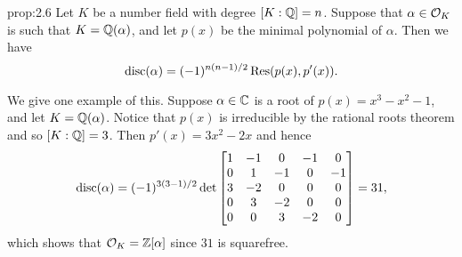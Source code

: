 \begin{prop}{prop:2.6}
    Let $K$ be a number field with degree $[K : \mathbb{Q}] = n$. Suppose that 
    $\alpha \in {\cal O}_K$ is such that $K = \mathbb{Q}(\alpha)$, and let 
    $p(x)$ be the minimal polynomial of $\alpha$. Then we have 
    \[ \operatorname{disc}(\alpha) = (-1)^{n(n-1)/2} \operatorname{Res}(p(x), p'(x)). \]
\end{prop}

We give one example of this. Suppose $\alpha \in \mathbb{C}$ is a root of 
$p(x) = x^3 - x^2 - 1$, and let $K = \mathbb{Q}(\alpha)$. Notice that $p(x)$ is 
irreducible by the rational roots theorem and so $[K : \mathbb{Q}] = 3$. 
Then $p'(x) = 3x^2 - 2x$ and hence 
\[ \operatorname{disc}(\alpha) = (-1)^{3(3-1)/2} \det \begin{bmatrix} 
    1 & -1 & 0 & -1 & 0 \\ 
    0 & 1 & -1 & 0 & -1 \\
    3 & -2 & 0 & 0 & 0 \\ 
    0 & 3 & -2 & 0 & 0 \\ 
    0 & 0 & 3 & -2 & 0
\end{bmatrix} = 31, \] 
which shows that ${\cal O}_K = \mathbb{Z}[\alpha]$ since $31$ is squarefree. 
